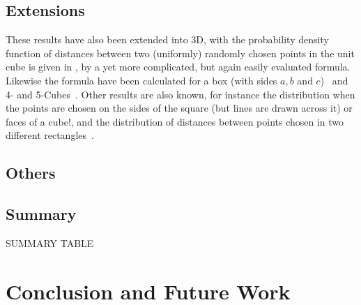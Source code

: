 \documentclass{article}
\begin{document}
\clearpage


\clearpage


\clearpage


% 

\clearpage
\subsection{Extensions}

These results have also been extended into 3D, with the probability
density function of distances between two (uniformly) randomly chosen
points in the unit cube is given in
\cite{mathai99:_distan,weisstein:_cube_line_picking}, by a yet more
complicated, but again easily evaluated formula. Likewise the formula
have been calculated for a box (with sides $a,b$ and
$c$)~\cite{philip:_probab_distr_distan_between_two} and 4- and
5-Cubes~\cite{philip:_probab_distr_distan_between_two_4d}. Other
results are also known, for instance the distribution when the points
are chosen on the sides of the square (but lines are drawn across it)
or faces of a cube!\cite{mathai99:_distan}, and the distribution of
distances between points chosen in two different
rectangles~\cite{b.ghosh51:_random_rect}.

\clearpage


\clearpage


\clearpage


\clearpage
\subsection{Others}


 
\clearpage
\subsection{Summary}
SUMMARY TABLE











\section{Conclusion and Future Work}




\setlength{\parskip}{1mm}


% 
\end{document}

